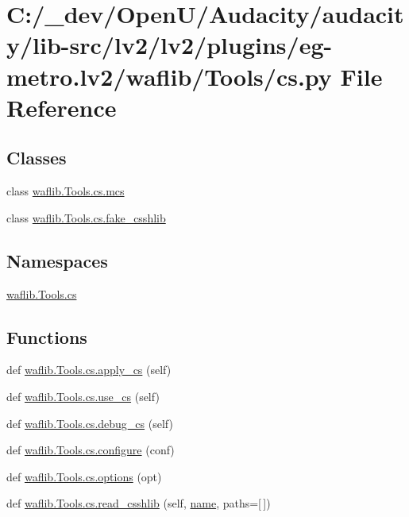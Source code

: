 \hypertarget{lv2_2plugins_2eg-metro_8lv2_2waflib_2_tools_2cs_8py}{}\section{C\+:/\+\_\+dev/\+Open\+U/\+Audacity/audacity/lib-\/src/lv2/lv2/plugins/eg-\/metro.lv2/waflib/\+Tools/cs.py File Reference}
\label{lv2_2plugins_2eg-metro_8lv2_2waflib_2_tools_2cs_8py}
\subsection*{Classes}
\begin{DoxyCompactItemize}
\item 
class \hyperlink{classwaflib_1_1_tools_1_1cs_1_1mcs}{waflib.\+Tools.\+cs.\+mcs}
\item 
class \hyperlink{classwaflib_1_1_tools_1_1cs_1_1fake__csshlib}{waflib.\+Tools.\+cs.\+fake\+\_\+csshlib}
\end{DoxyCompactItemize}
\subsection*{Namespaces}
\begin{DoxyCompactItemize}
\item 
 \hyperlink{namespacewaflib_1_1_tools_1_1cs}{waflib.\+Tools.\+cs}
\end{DoxyCompactItemize}
\subsection*{Functions}
\begin{DoxyCompactItemize}
\item 
def \hyperlink{namespacewaflib_1_1_tools_1_1cs_a27e68865096cf54da13a1d0d563bd4c2}{waflib.\+Tools.\+cs.\+apply\+\_\+cs} (self)
\item 
def \hyperlink{namespacewaflib_1_1_tools_1_1cs_a2962c0e94d37d4610f58b0e4911fbd9f}{waflib.\+Tools.\+cs.\+use\+\_\+cs} (self)
\item 
def \hyperlink{namespacewaflib_1_1_tools_1_1cs_ae5dd9312be558c0712218cdab22724b4}{waflib.\+Tools.\+cs.\+debug\+\_\+cs} (self)
\item 
def \hyperlink{namespacewaflib_1_1_tools_1_1cs_a97849d425e4332772dd4982ae091360f}{waflib.\+Tools.\+cs.\+configure} (conf)
\item 
def \hyperlink{namespacewaflib_1_1_tools_1_1cs_a20f520fa6e5a8eb6b064f7c5c82be0e0}{waflib.\+Tools.\+cs.\+options} (opt)
\item 
def \hyperlink{namespacewaflib_1_1_tools_1_1cs_aa175024b17365922ae423f6846c3ca7f}{waflib.\+Tools.\+cs.\+read\+\_\+csshlib} (self, \hyperlink{lib_2expat_8h_a1b49b495b59f9e73205b69ad1a2965b0}{name}, paths=\mbox{[}$\,$\mbox{]})
\end{DoxyCompactItemize}
